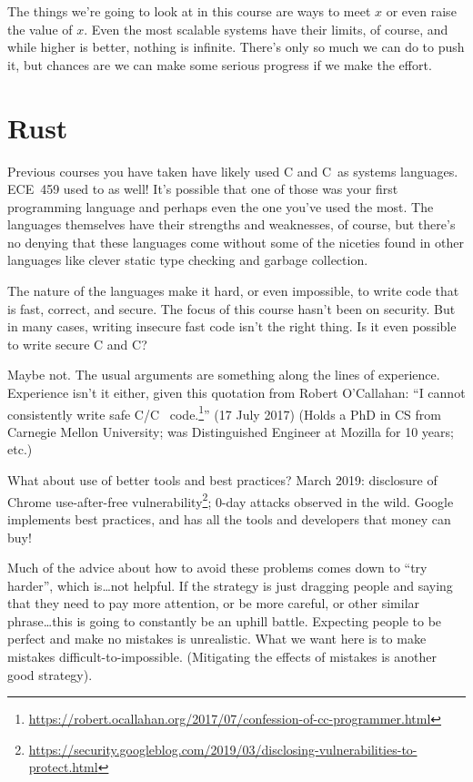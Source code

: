 \documentclass[a4paper]{report}
\newcommand{\CPP}{C\nolinebreak\hspace{-.05em}\raisebox{.4ex}{\tiny\bf +}\nolinebreak\hspace{-.10em}\raisebox{.4ex}{\tiny\bf +}}
\def\CPP{{C\nolinebreak[4]\hspace{-.05em}\raisebox{.4ex}{\tiny\bf ++}}}
\begin{document}
The things we're going to look at in this course are ways to meet $x$ or even raise the value of $x$. Even the most scalable systems have their limits, of course, and while higher is better, nothing is infinite. There's only so much we can do to push it, but chances are we can make some serious progress if we make the effort.

\section*{Rust}

Previous courses you have taken have likely used C and \CPP~as systems languages. ECE~459 used to as well! It's possible that one of those was your first programming language and perhaps even the one you've used the most. The languages themselves have their strengths and weaknesses, of course, but there's no denying that these languages come without some of the niceties found in other languages like clever static type checking and garbage collection.

The nature of the languages make it hard, or even impossible, to write code that is fast, correct, and secure. The focus of this course hasn't been on security. But in many cases, writing insecure fast code isn't the right thing. Is it even possible to write secure C and \CPP?

Maybe not. The usual arguments are something along the lines of experience. Experience isn't it either, given this quotation from Robert O'Callahan: ``I cannot consistently write safe C/\CPP~ code.\footnote{\url{https://robert.ocallahan.org/2017/07/confession-of-cc-programmer.html}}'' (17 July 2017) (Holds a PhD in CS from Carnegie Mellon University; was Distinguished Engineer at Mozilla for 10 years; etc.)

What about use of better tools and best practices? March 2019: disclosure of Chrome use-after-free vulnerability\footnote{\url{https://security.googleblog.com/2019/03/disclosing-vulnerabilities-to-protect.html}}; 0-day attacks
observed in the wild. Google implements best practices, and has all the tools and developers that
money can buy!

Much of the advice about how to avoid these problems comes down to ``try harder'', which is\ldots not helpful. If the strategy is just dragging people and saying that they need to pay more attention, or be more careful, or other similar phrase\ldots this is going to constantly be an uphill battle. Expecting people to be perfect and make no mistakes is unrealistic. What we want here is to make mistakes difficult-to-impossible. (Mitigating the effects of mistakes is another good strategy).
\end{document}
